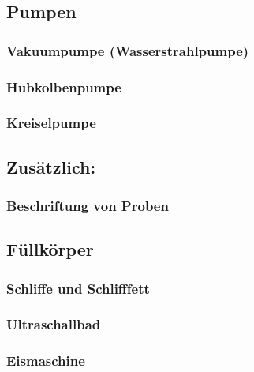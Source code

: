\subsection{Pumpen}
\subsubsection{Vakuumpumpe (Wasserstrahlpumpe)}
\subsubsection{Hubkolbenpumpe}
\subsubsection{Kreiselpumpe}

\subsection{Zusätzlich:}
\subsubsection{Beschriftung von Proben}
\subsection{Füllkörper}
\subsubsection{\hypertarget{Normschliff}{Schliffe} und Schlifffett}
\label{sec:normschliff}
\subsubsection{Ultraschallbad}
\subsubsection{Eismaschine}